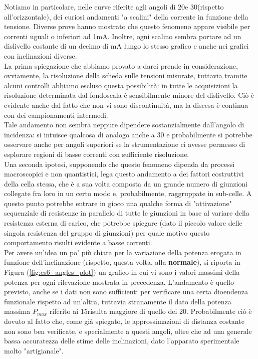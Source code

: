 \documentclass[journal, a4paper]{IEEEtran}
\begin{document}
Notiamo in particolare, nelle curve riferite agli angoli di 20\textdegree e 30\textdegree (rispetto all'orizzontale), dei curiosi andamenti "a scalini" della corrente in funzione della tensione. Diverse prove hanno mostrato che questo fenomeno appare visibile per correnti uguali o inferiori ad 1mA. Inoltre, ogni scalino sembra portare ad un dislivello costante di un decimo di mA lungo lo stesso grafico e anche nei grafici con inclinazioni diverse. \\
La prima spiegazione che abbiamo provato a darci prende in considerazione, ovviamente, la risoluzione della scheda sulle tensioni misurate, tuttavia tramite alcuni controlli abbiamo escluso questa possibilità: in tutte le acquisizioni la risoluzione determinata dal fondoscala è sensibilmente minore del dislivello. Ciò è evidente anche dal fatto che non vi sono discontinuità, ma la discesa è continua con dei campionamenti intermedi.\\
Tale andamento non sembra neppure dipendere sostanzialmente dall'angolo di incidenza: si intuisce qualcosa di analogo anche a 30 \textdegree e probabilmente si potrebbe osservare anche per angoli superiori se la strumentazione ci avesse permesso di esplorare regioni di basse correnti con sufficiente risoluzione.\\
Una seconda ipotesi, supponendo che questo fenomeno dipenda da processi macroscopici e non quantistici, lega questo andamento a dei fattori costruttivi della cella stessa, che è a sua volta composta da un grande numero di giunzioni collegate fra loro in un certo modo e, probabilmente, raggruppate in sub-celle. A questo punto potrebbe entrare in gioco una qualche forma di "attivazione" sequenziale di resistenze in parallelo di tutte le giunzioni in base al variare della resistenza esterna di carico, che potrebbe spiegare (dato il piccolo valore delle singola resistenza del gruppo di giunzioni) per quale motivo questo comportamento risulti evidente a basse correnti.\\

Per avere un'idea un po' più chiara per la variazione della potenza erogata in funzione dell'inclinazione (rispetto, questa volta, alla \textbf{normale}), si riporta in Figura (\ref{fig:es6_angles_plot}) un grafico in cui vi sono i valori massimi della potenza per ogni rilevazione mostrata in precedenza. L'andamento è quello previsto, anche se i dati non sono sufficienti per verificare una certa dioendenza funzionale rispetto ad un'altra, tuttavia stranamente il dato della potenza massima $P_{max}$ riferito ai 15\textdegree risulta maggiore di quello dei 20\textdegree. Probabilmente ciò è dovuto al fatto che, come già spiegato, le approssimazioni di distanza costante non sono ben verificate, e specialmente a questi angoli, oltre che ad una generale bassa accuratezza delle stime delle inclinazioni, dato l'apparato sperimentale molto "artigianale".\\
\end{document}
